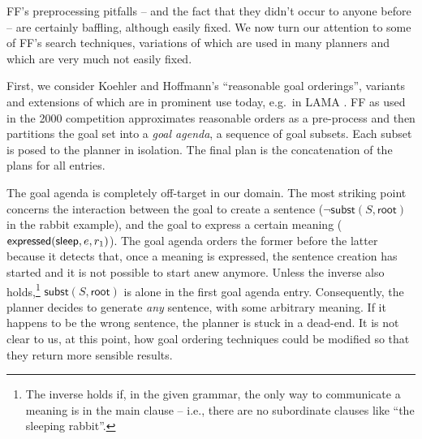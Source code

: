FF's preprocessing pitfalls -- and the fact that they didn't occur to
anyone before -- are certainly baffling, although easily fixed. We now
turn our attention to some of FF's search techniques, variations of
which are used in many planners and which are very much not easily
fixed.




First, we consider Koehler and Hoffmann's
 ``reasonable goal orderings'',
variants and extensions of which are in prominent use today, e.g.\ in
LAMA \cite{richter:etal:aaai-08}. FF as used in the 2000 competition
approximates reasonable orders as a pre-process and then partitions
the goal set into a {\em goal agenda}, a sequence of goal
subsets. Each subset is posed to the planner in isolation. The final
plan is the concatenation of the plans for all entries.


The goal agenda is completely off-target in our domain. The most
striking point concerns the interaction between the goal to create a
sentence ($\neg \mathsf{subst}(S,\mathsf{root})$ in the rabbit
example), and the goal to express a certain meaning
($\mathsf{expressed}(\mathsf{sleep},e,r_1)$). The goal agenda orders the former
before the latter because it detects that, once a meaning is
expressed, the sentence creation has started and it is not possible to
start anew anymore. Unless the inverse also holds,\footnote{The
  inverse holds if, in the given grammar, the only way to communicate
  a meaning is in the main clause -- i.e., there are no subordinate
  clauses like ``the sleeping rabbit''.}
$\mathsf{subst}(S,\mathsf{root})$ is alone in the first goal agenda
entry. Consequently, the planner decides to generate {\em any}
sentence, with some arbitrary meaning. If it happens to be the wrong
sentence, the planner is stuck in a dead-end. %
It is not clear to us, at this point, how goal ordering techniques
could be modified so that they return more sensible results.

